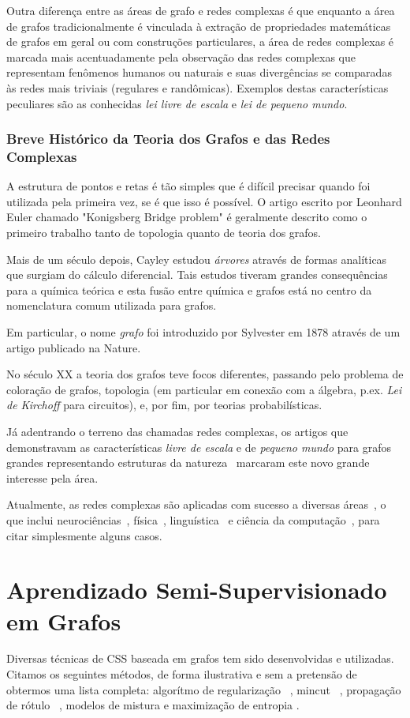 \documentclass[12pt]{article}
\begin{document}
Outra diferença entre as áreas de grafo e redes complexas é que enquanto a área de grafos tradicionalmente é vinculada à extração de propriedades matemáticas de grafos em geral ou com construções particulares, a área de redes complexas é marcada mais acentuadamente pela observação das redes complexas que representam fenômenos humanos ou naturais e suas divergências se comparadas às redes mais triviais (regulares e randômicas). Exemplos destas características peculiares são as conhecidas \emph{lei livre de escala} e \emph{lei de pequeno mundo}.

\subsubsection{Breve Histórico da Teoria dos Grafos e das Redes Complexas}
A estrutura de pontos e retas é tão simples que é difícil precisar quando foi utilizada pela primeira vez, se é que isso é possível. O artigo escrito por Leonhard Euler chamado "Konigsberg Bridge problem" é geralmente descrito como o primeiro trabalho tanto de topologia quanto de teoria dos grafos.

Mais de um século depois, Cayley estudou \emph{árvores} através de formas analíticas que surgiam do cálculo diferencial. Tais estudos tiveram grandes consequências para a química teórica e esta fusão entre química e grafos está no centro da nomenclatura comum utilizada para grafos.

Em particular, o nome \emph{grafo} foi introduzido por Sylvester em 1878 através de um artigo publicado na Nature.

No século XX a teoria dos grafos teve focos diferentes, passando pelo problema de coloração de grafos, topologia (em particular em conexão com a álgebra, p.ex. \emph{Lei de Kirchoff} para circuitos), e, por fim, por teorias probabilísticas.

Já adentrando o terreno das chamadas redes complexas, os artigos que demonstravam as características \emph{livre de escala} e de \emph{pequeno mundo} para grafos grandes representando estruturas da natureza~\cite{ferrer,barabasi} marcaram este novo grande interesse pela área.

Atualmente, as redes complexas são aplicadas com sucesso a diversas áreas~\cite{costaapp}, o que inclui neurociências~\cite{sporns}, física~\cite{pnas}, linguística~\cite{dorogo2} e ciência da computação~\cite{signature}, para citar simplesmente alguns casos.


\section{Aprendizado Semi-Supervisionado em Grafos}
Diversas técnicas de CSS baseada em grafos tem sido desenvolvidas e utilizadas. Citamos os seguintes métodos, de forma ilustrativa e sem a pretensão de obtermos uma lista completa: algorítmo de regularização ~\cite{reg}, mincut ~\cite{mincuts}, propagação de rótulo ~\cite{zhu3}, modelos de mistura e maximização de entropia \cite{zhu1}.
\end{document}
